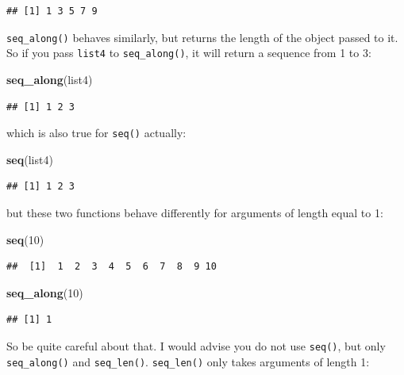 \documentclass[]{gitbook}
\newenvironment{Shaded}{\begin{snugshade}}{\end{snugshade}}
\newcommand{\DecValTok}[1]{\textcolor[rgb]{0.00,0.00,0.81}{#1}}
\newcommand{\KeywordTok}[1]{\textcolor[rgb]{0.13,0.29,0.53}{\textbf{#1}}}
\newcommand{\NormalTok}[1]{#1}
\begin{document}
\begin{verbatim}
## [1] 1 3 5 7 9
\end{verbatim}

\texttt{seq\_along()} behaves similarly, but returns the length of the object passed to it. So if you pass \texttt{list4} to
\texttt{seq\_along()}, it will return a sequence from 1 to 3:

\begin{Shaded}
\begin{Highlighting}[]
\KeywordTok{seq_along}\NormalTok{(list4)}
\end{Highlighting}
\end{Shaded}

\begin{verbatim}
## [1] 1 2 3
\end{verbatim}

which is also true for \texttt{seq()} actually:

\begin{Shaded}
\begin{Highlighting}[]
\KeywordTok{seq}\NormalTok{(list4)}
\end{Highlighting}
\end{Shaded}

\begin{verbatim}
## [1] 1 2 3
\end{verbatim}

but these two functions behave differently for arguments of length equal to 1:

\begin{Shaded}
\begin{Highlighting}[]
\KeywordTok{seq}\NormalTok{(}\DecValTok{10}\NormalTok{)}
\end{Highlighting}
\end{Shaded}

\begin{verbatim}
##  [1]  1  2  3  4  5  6  7  8  9 10
\end{verbatim}

\begin{Shaded}
\begin{Highlighting}[]
\KeywordTok{seq_along}\NormalTok{(}\DecValTok{10}\NormalTok{)}
\end{Highlighting}
\end{Shaded}

\begin{verbatim}
## [1] 1
\end{verbatim}

So be quite careful about that. I would advise you do not use \texttt{seq()}, but only \texttt{seq\_along()} and \texttt{seq\_len()}. \texttt{seq\_len()}
only takes arguments of length 1:
\end{document}
